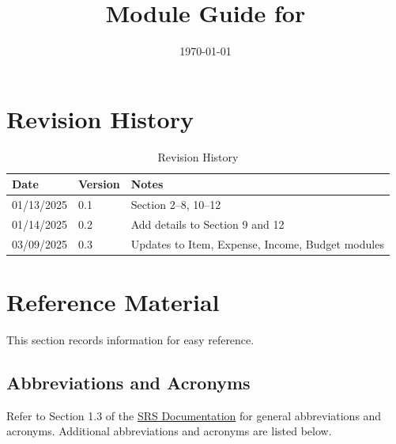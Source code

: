 \documentclass[12pt, titlepage]{article}
\begin{document}
\title{Module Guide for \progname{}} 
\author{\authname}
\date{\today}

\maketitle


\section{Revision History}

\begin{table}[H]
\caption{Revision History}
\centering
\begin{tabularx}{\textwidth}{p{3cm}p{2cm}X}
\toprule {\bf Date} & {\bf Version} & {\bf Notes}\\
\midrule
01/13/2025 & 0.1 & Section 2--8, 10--12\\
01/14/2025 & 0.2 & Add details to Section 9 and 12\\
03/09/2025 & 0.3 & Updates to Item, Expense, Income, Budget modules\\
\bottomrule
\end{tabularx}
\end{table}

\newpage

\section{Reference Material}

This section records information for easy reference.

\subsection{Abbreviations and Acronyms}

Refer to Section 1.3 of the
\href{https://github.com/PlutosCapstone/Plutos/blob/main/docs/SRS/SRS.pdf}{SRS
Documentation} for general abbreviations and acronyms. Additional abbreviations
and acronyms are listed below.
\end{document}
